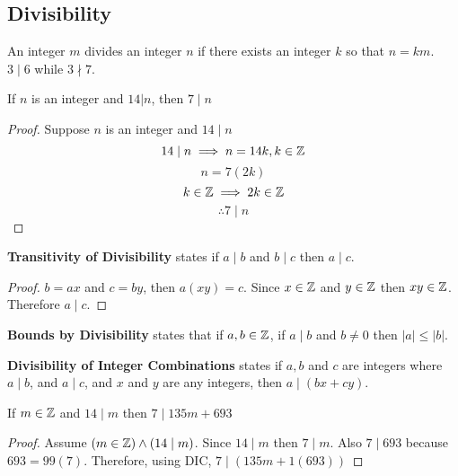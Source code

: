 \documentclass[english, 12pt]{article}
\begin{document}
\subsection{Divisibility}
\begin{defn}
An integer $m$ divides an integer $n$ if there exists an integer $k$ so that $n = km$. $3 \mid 6$ while $3 \nmid 7$.
\end{defn}
\begin{exmp}
If $n$ is an integer and $ 14 | n$, then $7 \mid n$
\begin{proof}
Suppose $n$ is an integer and $14 \mid n$
\[14 \mid n \implies n = 14k, k \in {\mathbb{Z}}\]
\[n = 7(2k)\]
\[ k \in {\mathbb{Z}} \implies 2k \in {\mathbb{Z}}\]
\[ \therefore 7 \mid n\]
\end{proof}
\end{exmp}

\begin{thrm}[TD]\th\label{thm:td}
\textbf{Transitivity of Divisibility} states if $a \mid b $ and $ b \mid c$ then $a \mid c$.
\begin{proof}
$ b=ax$ and $c=by$, then $a(xy)=c$. Since $x \in {\mathbb{Z}}$ and $y \in {\mathbb{Z}}$ then $xy \in {\mathbb{Z}}$. Therefore $a \mid c$.
\end{proof}
\end{thrm}
\begin{thrm}[BBD]
\textbf{Bounds by Divisibility} states that if $a,b \in {\mathbb{Z}}$, if $a \mid b$ and $b \neq 0$ then $|a| \leq |b|$.
\end{thrm}
\begin{thrm}[DIC]\th\label{thm:dic}
\textbf{Divisibility of Integer Combinations} states if $a, b$ and $c$ are integers where $a \mid b$, and $a \mid c$, and $x$ and $y$ are any integers, then $a \mid (bx + cy)$.
\end{thrm}
\begin{exmp}
If $m \in {\mathbb{Z}} $ and $14 \mid m$ then $ 7 \mid 135m + 693$
\begin{proof}
Assume $(m \in {\mathbb{Z}}) \land (14 \mid m)$. Since $14 \mid m$ then $7 \mid m$. Also $ 7 \mid 693$ because $693 = 99(7)$. Therefore, using DIC, $7 \mid (135m + 1(693))$
\end{proof}
\end{exmp}
\end{document}
